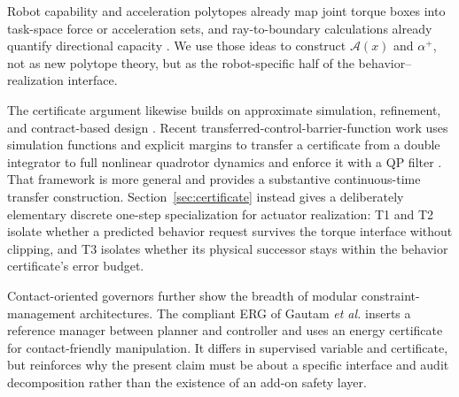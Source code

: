 \documentclass[journal]{IEEEtran}
\begin{document}
Robot capability and acceleration polytopes already map joint torque boxes into task-space force or acceleration sets, and ray-to-boundary calculations already quantify directional capacity \cite{r20}. We use those ideas to construct $\mathcal A(x)$ and $\alpha^+$, not as new polytope theory, but as the robot-specific half of the behavior--realization interface.

The certificate argument likewise builds on approximate simulation, refinement, and contract-based design \cite{r8,r9,r10}. Recent transferred-control-barrier-function work uses simulation functions and explicit margins to transfer a certificate from a double integrator to full nonlinear quadrotor dynamics and enforce it with a QP filter \cite{r19}. That framework is more general and provides a substantive continuous-time transfer construction. Section~\ref{sec:certificate} instead gives a deliberately elementary discrete one-step specialization for actuator realization: T1 and T2 isolate whether a predicted behavior request survives the torque interface without clipping, and T3 isolates whether its physical successor stays within the behavior certificate's error budget.

Contact-oriented governors further show the breadth of modular constraint-management architectures. The compliant ERG of 
Gautam \emph{et al.} inserts a reference manager between planner and controller and uses an energy certificate for 
contact-friendly manipulation\cite{r21}. It differs in supervised variable and certificate, but reinforces why the present claim must be about a specific interface and audit decomposition rather than the existence of an add-on safety layer.
\end{document}
